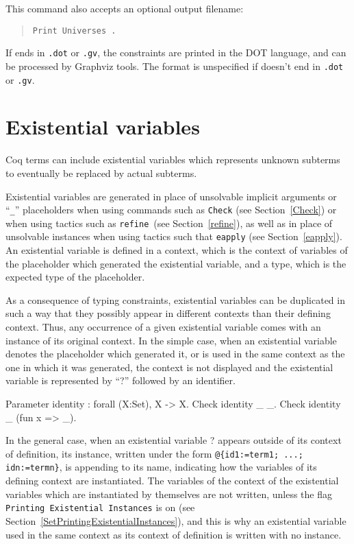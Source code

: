 This command also accepts an optional output filename:
\begin{quote}
\tt Print  Universes {\str}.
\end{quote}
If {\str} ends in \texttt{.dot} or \texttt{.gv}, the constraints are
printed in the DOT language, and can be processed by Graphviz
tools. The format is unspecified if {\str} doesn't end in
\texttt{.dot} or \texttt{.gv}.

\section[Existential variables]{Existential variables\label{ExistentialVariables}}
\label{evars}

Coq terms can include existential variables which
represents unknown subterms to eventually be replaced by actual
subterms.

Existential variables are generated in place of unsolvable implicit
arguments or ``{\tt \_}'' placeholders when using commands such as
\texttt{Check} (see Section~\ref{Check}) or when using tactics such as
\texttt{refine}~(see Section~\ref{refine}), as well as in place of unsolvable
instances when using tactics such that \texttt{eapply} (see
Section~\ref{eapply}). An existential variable is defined in a
context, which is the context of variables of the placeholder which
generated the existential variable, and a type, which is the expected
type of the placeholder. 

As a consequence of typing constraints, existential variables can be
duplicated in such a way that they possibly appear in different
contexts than their defining context. Thus, any occurrence of a given
existential variable comes with an instance of its original context. In the
simple case, when an existential variable denotes the placeholder
which generated it, or is used in the same context as the one in which
it was generated, the context is not displayed and the existential
variable is represented by ``?'' followed by an identifier.

\begin{coq_example}
Parameter identity : forall (X:Set), X -> X.
Check identity _ _.
Check identity _ (fun x => _).
\end{coq_example}

In the general case, when an existential variable ?{\ident}
appears outside of its context of definition, its instance, written under
the form \verb!@{id1:=term1; ...; idn:=termn}!, is appending to its
name, indicating how the variables of its defining context are
instantiated.  The variables of the context of the existential
variables which are instantiated by themselves are not written, unless
the flag {\tt Printing Existential Instances} is on (see
Section~\ref{SetPrintingExistentialInstances}), and this is why an
existential variable used in the same context as its context of
definition is written with no instance.

